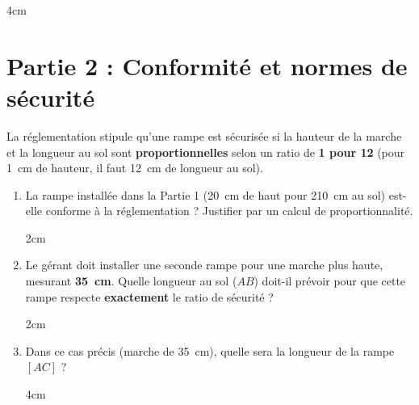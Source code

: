 \documentclass[a4paper]{book}
\begin{document}
{\begin{exercice}
        \begin{ZoneReponse}{4cm}
        \end{ZoneReponse}
        
        \section*{Partie 2 : Conformité et normes de sécurité}
        La réglementation stipule qu'une rampe est sécurisée si la hauteur de la marche et la longueur au sol sont \textbf{proportionnelles} selon un ratio de \textbf{1 pour 12} (pour 1~cm de hauteur, il faut 12~cm de longueur au sol).
        
        \begin{enumerate}[resume,leftmargin=*]
            \item La rampe installée dans la Partie 1 (20~cm de haut pour 210~cm au sol) est-elle conforme à la réglementation ? Justifier par un calcul de proportionnalité.

            \begin{ZoneReponse}{2cm}
            \end{ZoneReponse}

            \item Le gérant doit installer une seconde rampe pour une marche plus haute, mesurant \textbf{35~cm}. Quelle longueur au sol ($AB$) doit-il prévoir pour que cette rampe respecte \textbf{exactement} le ratio de sécurité ?
            
            \begin{ZoneReponse}{2cm}
            \end{ZoneReponse}
            
            \item Dans ce cas précis (marche de 35~cm), quelle sera la longueur de la rampe $[AC]$ ?

            \begin{ZoneReponse}{4cm}
            \end{ZoneReponse}
        \end{enumerate}
    \end{exercice}

}
\end{document}
